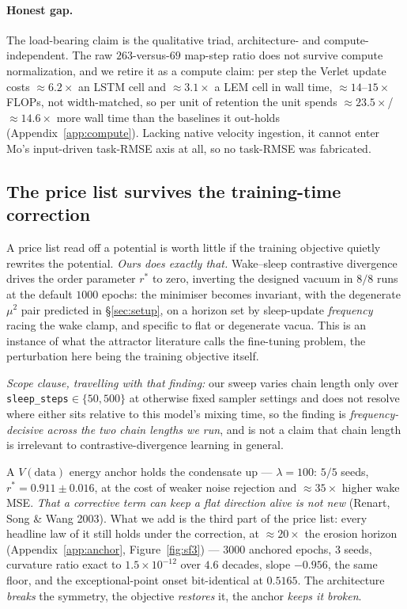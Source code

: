\documentclass{article}
\begin{document}
\paragraph{Honest gap.} The load-bearing claim is the qualitative triad, architecture- and compute-independent. The raw $263$-versus-$69$ map-step ratio does not survive compute normalization, and we retire it as a compute claim: per step the Verlet update costs $\approx6.2\times$ an LSTM cell and $\approx3.1\times$ a LEM cell in wall time, $\approx14$--$15\times$ FLOPs, not width-matched, so per unit of retention the unit spends $\approx23.5\times$/$\approx14.6\times$ more wall time than the baselines it out-holds (Appendix~\ref{app:compute}). Lacking native velocity ingestion, it cannot enter Mo's input-driven task-RMSE axis at all, so no task-RMSE was fabricated.

\subsection{The price list survives the training-time correction}\label{sec:cure}

A price list read off a potential is worth little if the training objective quietly rewrites the potential. \emph{Ours does exactly that.} Wake--sleep contrastive divergence drives the order parameter $r^*$ to zero, inverting the designed vacuum in $8/8$ runs at the default $1000$ epochs: the minimiser becomes invariant, with the degenerate $\mu^2$ pair predicted in \S\ref{sec:setup}, on a horizon set by sleep-update \emph{frequency} racing the wake clamp, and specific to flat or degenerate vacua. This is an instance of what the attractor literature calls the fine-tuning problem, the perturbation here being the training objective itself. {\footnotesize\emph{Scope clause, travelling with that finding:} our sweep varies chain length only over \texttt{sleep\_steps}$\in\{50,500\}$ at otherwise fixed sampler settings and does not resolve where either sits relative to this model's mixing time, so the finding is \emph{frequency-decisive across the two chain lengths we run}, and is not a claim that chain length is irrelevant to contrastive-divergence learning in general.\par} A $V(\text{data})$ energy anchor holds the condensate up --- $\lambda=100$: $5/5$ seeds, $r^*=0.911\pm0.016$, at the cost of weaker noise rejection and $\approx35\times$ higher wake MSE. \emph{That a corrective term can keep a flat direction alive is not new} (Renart, Song \& Wang 2003). What we add is the third part of the price list: every headline law of it still holds under the correction, at $\approx20\times$ the erosion horizon (Appendix~\ref{app:anchor}, Figure~\ref{fig:sf3}) --- $3000$ anchored epochs, $3$ seeds, curvature ratio exact to $1.5\!\times\!10^{-12}$ over $4.6$ decades, slope $-0.956$, the same floor, and the exceptional-point onset bit-identical at $0.5165$. The architecture \emph{breaks} the symmetry, the objective \emph{restores} it, the anchor \emph{keeps it broken}.
\end{document}
